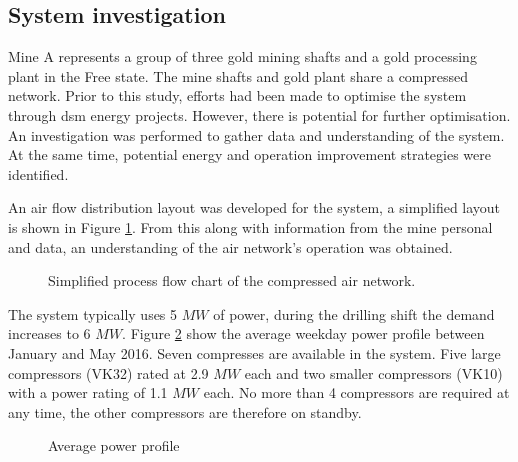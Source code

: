 \subsection{System investigation}
Mine A represents a group of three gold mining shafts and a gold processing plant in the Free state. The mine shafts and gold plant share a compressed network. Prior to this study, efforts had been made to optimise the system through \gls{dsm} energy projects. However, there is potential for further optimisation. An investigation was performed to gather data and understanding of the system. At the same time, potential energy and operation improvement strategies were identified.
\par 
An air flow distribution layout was developed for the system, a simplified layout is shown in Figure \ref{fig: Beatrix Air layout}. From this along with information from the mine personal and data, an understanding of the air network's operation was obtained. 
\par 
\begin{figure}[h!]
	\centering
	\caption{Simplified process flow chart of the compressed air network.}
	\label{fig: Beatrix Air layout}
\end{figure}

The system typically uses 5 $MW$ of power,  during the drilling shift the demand increases to 6 $MW$. Figure \ref{fig: Beatrix power baseline} show the average weekday power profile between January and May 2016. Seven compresses are available in the system. Five large compressors (VK32) rated at 2.9 $MW$ each and two smaller compressors (VK10) with a power rating of 1.1 $MW$ each. No more than 4 compressors are required at any time, the other compressors are therefore on standby.
\begin{figure}[h!]
	\centering
	
	\caption{Average power profile}
	\label{fig: Beatrix power baseline}
\end{figure}

